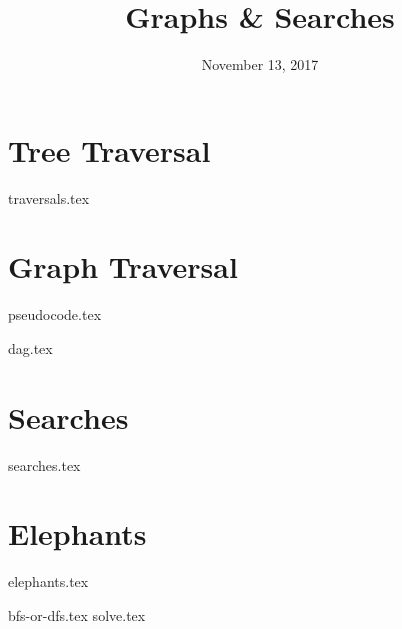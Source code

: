 \documentclass[11pt]{exam}
\title{Graphs \& Searches}
\date{November 13, 2017}
\begin{document}
\maketitle

\section{Tree Traversal}
\begin{questions}
{traversals.tex}
\end{questions}

\section{Graph Traversal}
{pseudocode.tex}
\begin{questions}
{dag.tex}
\end{questions}

\clearpage

\section{Searches}
\begin{questions}
{searches.tex}
\end{questions}

\section{Elephants}
{elephants.tex}
\begin{questions}
{bfs-or-dfs.tex}
{solve.tex}
\end{questions}
\end{document}

